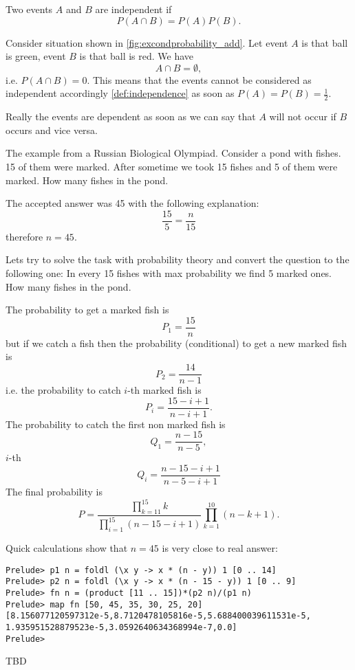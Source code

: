 \begin{definition}[Independence]
\label{def:independence}
Two events $A$ and $B$ are independent if 
\[
P\left(A \cap B\right) = 
P\left(A\right) P\left(B\right). 
\]
\end{definition}

\begin{example}
Consider situation shown in \cref{fig:excondprobability_add}. Let
event $A$ is that ball is green, event $B$ is that ball is red. We
have
\[
A \cap B = \emptyset, 
\]
i.e. $P\left(A \cap B\right) = 0$. This means that the events cannot
be considered as independent accordingly \cref{def:independence} as
soon as $P\left(A\right) = 
P\left(B\right) = \frac{1}{2}$.

Really the events are dependent as soon as we can say that $A$ will
not occur if $B$ occurs and vice versa.
\end{example}

\begin{example}
The example from a Russian Biological Olympiad. Consider a pond with
fishes. 15 of them were marked. After sometime we took 15 fishes and 5
of them were marked. How many fishes in the pond.

The accepted answer was 45 with the following explanation: 
\[
\frac{15}{5} = \frac{n}{15}
\]
therefore $n=45$.

Lets try to solve the task with probability theory and convert the
question to the following one: In every 15 fishes with max probability
we find 5 marked ones. How many fishes in the pond.

The probability to get a marked fish is
\[
P_1 = \frac{15}{n}
\]
but if we catch a fish then the probability (conditional) to get a new
marked fish is
\[
P_2 = \frac{14}{n-1}
\]
i.e. the probability to catch $i$-th marked fish is
\[
P_i = \frac{15-i+1}{n - i + 1}.
\]
The probability to catch the first non marked fish is
\[
Q_1 = \frac{n - 15}{n - 5},
\]
$i$-th
\[
Q_i = \frac{n -15 -i + 1}{n - 5 - i + 1}
\]
The final probability is
\[
P = \frac{\prod_{k=11}^{15}k}{\prod_{i = 1}^{15}{\left(n - 15 - i +
    1\right)}}\prod_{k=1}^{10}{\left(n -k + 1\right)}.
\]

Quick calculations show that $n=45$ is very close to real answer: 
\begin{verbatim}
Prelude> p1 n = foldl (\x y -> x * (n - y)) 1 [0 .. 14]
Prelude> p2 n = foldl (\x y -> x * (n - 15 - y)) 1 [0 .. 9]
Prelude> fn n = (product [11 .. 15])*(p2 n)/(p1 n)
Prelude> map fn [50, 45, 35, 30, 25, 20]
[8.156077120597312e-5,8.7120478105816e-5,5.688400039611531e-5,
1.935951528879523e-5,3.0592640634368994e-7,0.0]
Prelude> 
\end{verbatim}

\end{example}

TBD \cite{bib:kolmogorov74basic}
